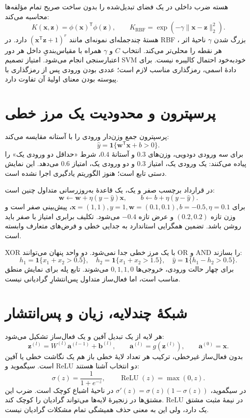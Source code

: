 هسته ضرب داخلی در یک فضای تبدیل‌شده را بدون ساخت صریح تمام مؤلفه‌ها محاسبه می‌کند:
\[K(\mathbf x,\mathbf z)=\phi(\mathbf x)^\mathsf T\phi(\mathbf z),\qquad K_{\mathrm{RBF}}=\exp(-\gamma\|\mathbf x-\mathbf z\|_2^2).\]
هستهٔ چندجمله‌ای نمونه‌ای مانند $(\mathbf x^\mathsf T\mathbf z+1)^r$ دارد. در RBF ، بزرگ شدن $\gamma$ ناحیهٔ اثر هر نقطه را محلی‌تر می‌کند. انتخاب $C$ و $\gamma$ همراه با مقیاس‌بندیِ داخل هر دور اعتبارسنجی انجام می‌شود. امتیاز تصمیم SVM خودبه‌خود احتمال کالیبره نیست. برای دادهٔ اسمی، رمزگذاری مناسب لازم است؛ عددی بودن ورودی پس از رمزگذاری با پیوسته بودن معنای اولیهٔ آن تفاوت دارد.

\section{پرسپترون و محدودیت یک مرز خطی}
پرسپترون جمع وزن‌دار ورودی را با آستانه مقایسه می‌کند:
\[\widehat y=\mathbf1\{\mathbf w^\mathsf T\mathbf x+b>0\}.\]
برای سه ورودی دودویی، وزن‌های $0.3$ و آستانهٔ $0.4$، شرط «حداقل دو ورودی یک» را پیاده می‌کنند: یک ورودی یک، امتیاز $0.3$ و دو ورودی یک، امتیاز $0.6$ می‌دهد. این نمایش دستی تابع است؛ هنوز الگوریتم یادگیری اجرا نشده است.

در قرارداد برچسب صفر و یک، یک قاعدهٔ به‌روزرسانی متداول چنین است:
\[\mathbf w\leftarrow\mathbf w+\eta(y-\widehat y)\mathbf x,\qquad b\leftarrow b+\eta(y-\widehat y).\]
برای $\mathbf x=(1,1),y=1,\mathbf w=(0.1,0.1),b=-0.5,\eta=0.1$، پیش‌بینی صفر است و وزن تازه $(0.2,0.2)$ و عرض تازه $-0.4$ می‌شود. تکلیف برابری امتیاز با صفر باید روشن باشد. تضمین همگرایی استاندارد به جدایی خطی و فرض‌های متعارف وابسته است.

XOR با یک مرز خطی جدا نمی‌شود. دو واحد پنهان می‌توانند OR و AND را بسازند:
\[h_1=\mathbf1\{x_1+x_2>0.5\},\quad h_2=\mathbf1\{x_1+x_2>1.5\},\quad \widehat y=\mathbf1\{h_1-h_2>0.5\}.\]
برای چهار حالت ورودی، خروجی‌ها $0,1,1,0$ می‌شوند. تابع پله برای نمایش منطق مناسب است، اما فعال‌ساز متداول پس‌انتشارِ گرادیانی نیست.

\section{شبکهٔ چندلایه، زیان و پس‌انتشار}
هر لایه از یک تبدیل آفین و یک فعال‌ساز تشکیل می‌شود:
\[\mathbf z^{(l)}=W^{(l)}\mathbf a^{(l-1)}+\mathbf b^{(l)},\qquad \mathbf a^{(l)}=g(\mathbf z^{(l)}),\qquad \mathbf a^{(0)}=\mathbf x.\]
بدون فعال‌ساز غیرخطی، ترکیب هر تعداد لایهٔ خطی باز هم یک نگاشت خطی یا آفین است. سیگموید و ReLU دو انتخاب آشنا هستند:
\[\sigma(z)=\frac1{1+e^{-z}},\qquad\operatorname{ReLU}(z)=\max(0,z).\]
در سیگموید، $\sigma'(z)=\sigma(z)(1-\sigma(z))$ در ناحیهٔ اشباع کوچک است. ضرب این مشتق‌ها در زنجیرهٔ لایه‌ها می‌تواند گرادیان را کوچک کند. ReLU در نیمهٔ مثبت مشتق یک دارد، ولی این به معنی حذف همیشگی تمام مشکلات گرادیان نیست.

